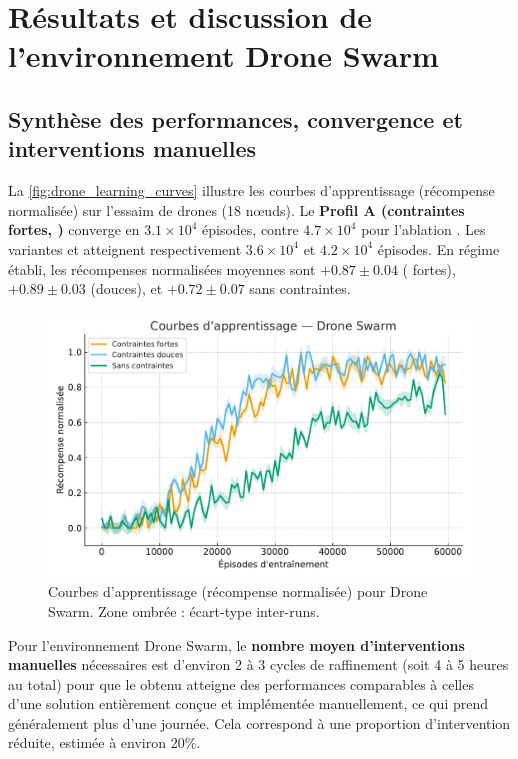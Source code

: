 \section{Résultats et discussion de l'environnement Drone Swarm}\label{sec:results_and_discussion_drone_swarm}

\subsection*{Synthèse des performances, convergence et interventions manuelles}

La \autoref{fig:drone_learning_curves} illustre les courbes d'apprentissage (récompense normalisée) sur l'essaim de drones (18 nœuds).
Le \textbf{Profil A (contraintes fortes, )} converge en $3.1\times 10^4$ épisodes, contre $4.7\times 10^4$ pour l'ablation .
Les variantes  et  atteignent respectivement $3.6\times 10^4$ et $4.2\times 10^4$ épisodes.
En régime établi, les récompenses normalisées moyennes sont $+0.87 \pm 0.04$ ( fortes), $+0.89 \pm 0.03$ (douces), et $+0.72 \pm 0.07$ sans contraintes.

\begin{figure}[h!]
  \centering
  \includegraphics[width=0.75\linewidth]{figures/results_drone_learning.pdf}
  \caption[Courbes d'apprentissage (récompense normalisée) pour Drone Swarm]{Courbes d'apprentissage (récompense normalisée) pour Drone Swarm. Zone ombrée : écart-type inter-runs.}
  \label{fig:drone_learning_curves}
\end{figure}

Pour l'environnement Drone Swarm, le \textbf{nombre moyen d'interventions manuelles} nécessaires est d'environ 2 à 3 cycles de raffinement (soit 4 à 5 heures au total) pour que le  obtenu atteigne des performances comparables à celles d'une solution entièrement conçue et implémentée manuellement, ce qui prend généralement plus d'une journée. Cela correspond à une proportion d'intervention réduite, estimée à environ 20\%.


